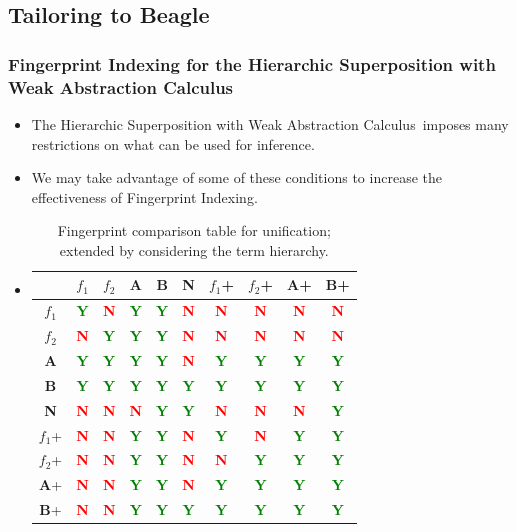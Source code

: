 \documentclass[10pt,xcolor={dvipsnames}]{beamer}
\newcommand{\HSWAC}{Hierarchic Superposition with Weak Abstraction Calculus}
\newcommand{\compY}{\textcolor{Green}{\textbf{Y}}}
\newcommand{\compN}{\textcolor{Red}{\textbf{N}}}
\begin{document}
\begin{NoHyper}
\subsection{Tailoring to Beagle}
\begin{frame}
  \frametitle{Fingerprint Indexing for the Hierarchic Superposition with Weak Abstraction Calculus}
  \begin{itemize}
  \item<1-> The \HSWAC\ imposes many restrictions on what can be used for inference.
  \item<2-> We may take advantage of some of these conditions to increase the effectiveness of Fingerprint Indexing.
  \item<2->[]\begin{table}[H]\scriptsize
  \caption{Fingerprint comparison table for unification; extended by considering the term hierarchy.}
  \label{tab:extunif}
  \begin{tabular}{| c || c | c | c | c | c || c | c | c | c |}
  \hline
            &  $f_1$  &  $f_2$  &  \textbf{A} &  \textbf{B} &  \textbf{N} &    $f_1$+  & $f_2$+  & \textbf{A}+ & \textbf{B}+ \\ \hline \hline
  $f_1$     &  \compY &  \compN &  \compY     &  \compY     &  \compN     &    \compN  & \compN  & \compN      & \compN      \\ 
  $f_2$     &  \compN &  \compY &  \compY     &  \compY     &  \compN     &    \compN  & \compN  & \compN      & \compN      \\ 
\textbf{A}  &  \compY &  \compY &  \compY     &  \compY     &  \compN     &    \compY  & \compY  & \compY      & \compY      \\
\textbf{B}  &  \compY &  \compY &  \compY     &  \compY     &  \compY     &    \compY  & \compY  & \compY      & \compY      \\ 
\textbf{N}  &  \compN &  \compN &  \compN     &  \compY     &  \compY     &    \compN  & \compN  & \compN      & \compY      \\ \hline \hline
%
$f_1$+      &  \compN &  \compN &  \compY     &  \compY     &  \compN     &    \compY  & \compN  & \compY      & \compY      \\ 
$f_2$+      &  \compN &  \compN &  \compY     &  \compY     &  \compN     &    \compN  & \compY  & \compY      & \compY      \\ 
\textbf{A}+ &  \compN &  \compN &  \compY     &  \compY     &  \compN     &    \compY  & \compY  & \compY      & \compY      \\
\textbf{B}+ &  \compN &  \compN &  \compY     &  \compY     &  \compY     &    \compY  & \compY  & \compY      & \compY      \\ \hline
  \end{tabular}\end{table}
  \end{itemize}


\end{frame}
\end{NoHyper}
\end{document}
